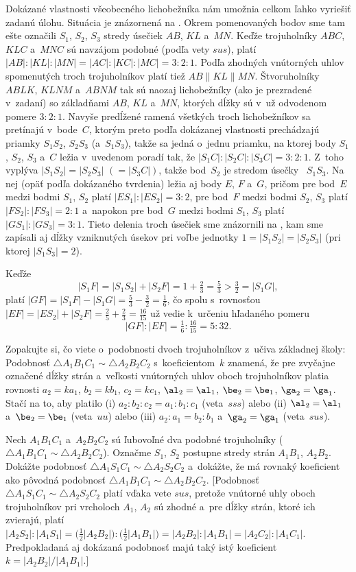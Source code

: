 {Dokázané vlastnosti všeobecného lichobežníka nám umožnia celkom
ľahko vyriešiť zadanú úlohu. Situácia je znázornená na \obr.
Okrem pomenovaných bodov sme tam ešte označili $S_1$, $S_2$, $S_3$
stredy úsečiek $AB$, $KL$ a~$MN$.
%
Keďže trojuholníky $ABC$, $KLC$ a~$MNC$ sú navzájom podobné (podľa
vety $sus$), platí $|AB|:|KL|:|MN|=|AC|:|KC|:|MC|=3:2:1$.
Podľa zhodných vnútorných uhlov spomenutých troch trojuholníkov platí
tiež $AB\parallel KL\parallel MN$.
Štvoruholníky $ABLK$, $KLNM$ a~$ABNM$ tak sú
naozaj lichobežníky (ako je prezradené v~zadaní) so základňami
$AB$, $KL$ a~$MN$, ktorých dĺžky sú v~už odvodenom pomere
$3:2:1$. Navyše predĺžené ramená všetkých troch lichobežníkov sa
pretínajú v~bode~$C$, ktorým preto podľa dokázanej vlastnosti
prechádzajú priamky $S_1S_2$, $S_2S_3$ (a~$S_1S_3$), takže sa jedná
o~jednu priamku, na ktorej body $S_1$, $S_2$, $S_3$ a~$C$ ležia
v~uvedenom poradí tak, že $|S_1C|:|S_2C|:|S_3C|={3:2:1}$. Z~toho vyplýva
$|S_1S_2|=|S_2S_3|$ $(=|S_3C|)$, takže bod~$S_2$ je stredom úsečky~
$S_1S_3$. Na nej (opäť podľa dokázaného tvrdenia) ležia aj body
$E$, $F$ a~$G$, pričom pre bod~$E$ medzi bodmi $S_1$, $S_2$ platí
$|ES_1|:|ES_2|=3:2$, pre bod~$F$ medzi bodmi $S_2$, $S_3$ platí
$|FS_2|:|FS_3|=2:1$ a~napokon pre bod~$G$ medzi bodmi
$S_1$, $S_3$ platí $|GS_1|:|GS_3|=3:1$. Tieto delenia troch úsečiek sme
znázornili na \obr, kam sme zapísali aj dĺžky vzniknutých úsekov pri
voľbe jednotky $1=|S_1S_2|=|S_2S_3|$ (pri ktorej $|S_1S_3|=2$).
%

Keďže
$$
|S_1F|=|S_1S_2|+|S_2F|=1+\tfrac23=\tfrac53>\tfrac32=|S_1G|,
$$
platí $|GF|=|S_1F|-|S_1G|=\frac53-\frac32=\frac16$, čo spolu
s~rovnosťou $|EF|=|ES_2|+|S_2F|=\frac25+\frac23=\frac{16}{15}$ už vedie
k~určeniu hľadaného pomeru
$$
|GF|:|EF|=\tfrac16:\tfrac{16}{15}=5:32.
$$


Zopakujte si, čo viete o~podobnosti dvoch trojuholníkov z~učiva
základnej školy: Podobnosť $\triangle A_1B_1C_1\sim \triangle
A_2B_2C_2$ s~koeficientom~$k$ znamená, že pre zvyčajne označené
dĺžky strán a~veľkosti vnútorných uhlov oboch trojuholníkov platia rovnosti
$a_2=ka_1$, $b_2=kb_1$, $c_2=kc_1$, $\al_2=\al_1$,
$\be_2=\be_1$, $\ga_2=\ga_1$. Stačí na to, aby platilo
(i) $a_2:b_2:c_2=a_1:b_1:c_1$ (veta~$sss$) alebo
(ii) $\al_2=\al_1$ a~$\be_2=\be_1$ (veta~$uu$) alebo
(iii) $a_2:a_1=b_2:b_1$ a~$\ga_2=\ga_1$ (veta~$sus$).

Nech $A_1B_1C_1$ a~$A_2B_2C_2$ sú
ľubovoľné dva podobné trojuholníky ($\triangle A_1B_1C_1\sim \triangle
A_2B_2C_2$). Označme $S_1$, $S_2$ postupne stredy strán $A_1B_1$,
$A_2B_2$. Dokážte podobnosť $\triangle A_1S_1C_1\sim \triangle
A_2S_2C_2$ a~dokážte, že má rovnaký koeficient ako
pôvodná podobnosť $\triangle A_1B_1C_1\sim \triangle
A_2B_2C_2$. [Podobnosť $\triangle A_1S_1C_1\sim \triangle
A_2S_2C_2$ platí vďaka vete $sus$, pretože vnútorné uhly oboch trojuholníkov
pri vrcholoch $A_1$, $A_2$ sú zhodné a~pre dĺžky strán, ktoré ich
zvierajú, platí $|A_2S_2|:|A_1S_1|=
\bigl(\frac12|A_2B_2|\bigr):\bigl(\frac12|A_1B_1|\bigr)=
|A_2B_2|:|A_1B_1|=|A_2C_2|:|A_1C_1|$. Predpokladaná aj dokázaná podobnosť
majú taký istý koeficient $k=|A_2B_2|/|A_1B_1|$.]

}
